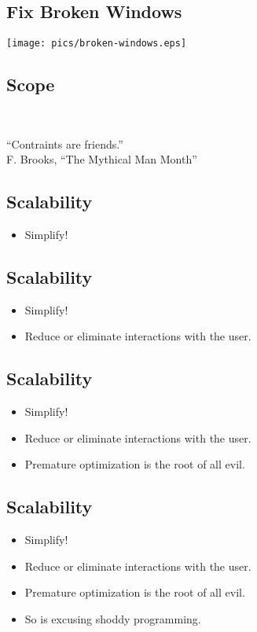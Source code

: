 \documentclass[xga]{xdvislides}
\begin{document}
\subsection{Fix Broken Windows}
\vspace*{\fill}
\begin{center}
	\texttt{[image: pics/broken-windows.eps]}
\end{center}
\vspace*{\fill}

\subsection{Scope}
\\
\Huge
\begin{center}
	``Contraints are friends.'' \\
	\addvspace{.2in}
	\small F. Brooks, ``The Mythical Man Month''
\end{center}
\Normalsize


\subsection{Scalability}
\begin{itemize}
	\item Simplify!
\end{itemize}

\subsection{Scalability}
\begin{itemize}
	\item Simplify!
	\item Reduce or eliminate interactions with the user.
\end{itemize}

\subsection{Scalability}
\begin{itemize}
	\item Simplify!
	\item Reduce or eliminate interactions with the user.
	\item Premature optimization is the root of all evil.
\end{itemize}

\subsection{Scalability}
\begin{itemize}
	\item Simplify!
	\item Reduce or eliminate interactions with the user.
	\item Premature optimization is the root of all evil.
	\item So is excusing shoddy programming.
\end{itemize}
\end{document}
